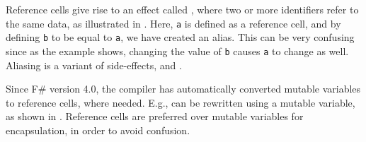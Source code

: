 Reference cells give rise to an effect called , where two or more identifiers refer to the same data, as illustrated in .
%
%
Here, \lstinline!a! is defined as a reference cell, and by defining \lstinline!b! to be equal to \lstinline!a!, we have created an alias. This can be very confusing since as the example shows, changing the value of \lstinline!b! causes \lstinline!a! to change as well. Aliasing is a variant of side-effects, and .

Since F\# version 4.0, the compiler has automatically converted mutable variables to reference cells, where needed.  E.g.,  can be rewritten using a mutable variable, as shown in .
% 
% 
Reference cells are preferred over mutable variables for encapsulation, in order to avoid confusion.

